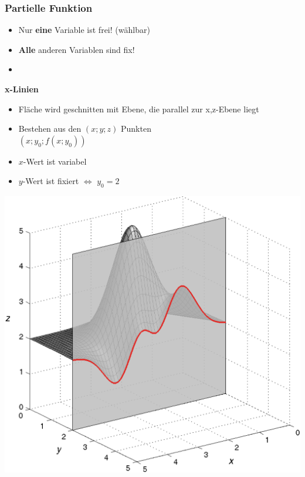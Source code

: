 \subsubsection{Partielle Funktion}

\begin{itemize}
    \item Nur \textbf{eine} Variable ist frei! (wählbar)
    \item \textbf{Alle} anderen Variablen sind fix!
    \item[] 
\end{itemize}


\begin{minipage}[t]{0.48\columnwidth}
    \textbf{x-Linien}
    \begin{itemize}
        \item Fläche wird geschnitten mit Ebene, die parallel zur x,z-Ebene liegt
        \item Bestehen aus den $(x;y;z)$ Punkten\\
        $(x ; y_0 ; f(x;y_0))$
        \item ${x}$-Wert ist variabel
        \item ${y}$-Wert ist fixiert $\Leftrightarrow$ $y_0 = 2$
    \end{itemize}
    
    \includegraphics[width=\columnwidth]{images/schnitt_y0.png}
\end{minipage}
